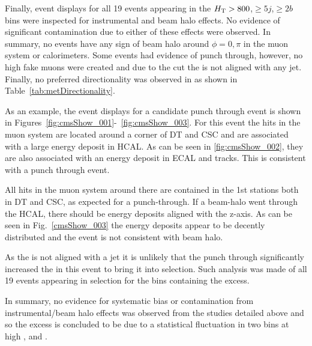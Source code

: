 Finally, event displays for all 19 events appearing in the $\scalht > 800$,$\geq5j$,$\ge2b$ bins
were inspected for instrumental and beam halo effects. No evidence of significant contamination
due to either of these effects were observed. In summary, no events have any sign of beam halo
around $\phi = 0,\pi$ in the muon system or calorimeters. Some events had evidence of punch 
through, however, no high \pt fake muons were created and due to the \bdphi cut the \met is
not aligned with any jet. Finally, no preferred directionality was observed in \met as shown
in Table~\ref{tab:metDirectionality}.



As an example, the event displays for a candidate punch through event is shown in 
Figures~\ref{fig:cmsShow_001}-~\ref{fig:cmsShow_003}.
For this event the hits in the muon system are located around a corner of DT and
CSC and are associated with a large energy deposit in HCAL. As can be seen
in \ref{fig:cmsShow_002}, they are also associated with an energy deposit in ECAL and tracks.
This is consistent with a punch through event.

All hits in the muon system around there are contained in the 1st
stations both in DT and CSC, as expected for a punch-through. 
If a beam-halo went through the HCAL, there should be energy deposits
aligned with the z-axis. As can be seen in Fig.~\ref{cmsShow_003} the energy deposits
appear to be decently distributed and the event is not consistent with beam halo.

As the \met is not aligned with a jet it is unlikely that the punch through
significantly increased the \met in this event to bring it into selection. 
Such analysis was made of all 19 events appearing in selection for the bins
containing the excess.

In summary, no evidence for systematic bias or contamination from 
instrumental/beam halo effects was observed from the studies detailed above
and so the excess is concluded to be due to a statistical fluctuation 
in two bins at high \njet, \nb and \scalht. 

